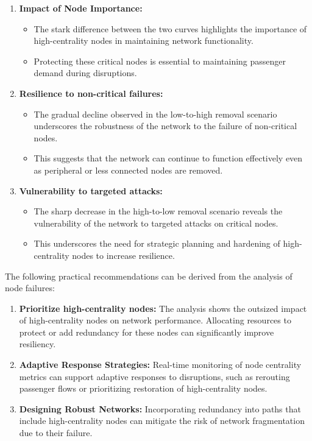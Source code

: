 \documentclass[
  letterpaper,
  DIV=11,
  numbers=noendperiod]{scrartcl}
\providecommand{\tightlist}{%
  \setlength{\itemsep}{0pt}\setlength{\parskip}{0pt}}\usepackage{longtable,booktabs,array}
\begin{document}
\begin{enumerate}
\def\labelenumi{\arabic{enumi}.}
\item
  \textbf{Impact of Node Importance:}

  \begin{itemize}
  \tightlist
  \item
    The stark difference between the two curves highlights the
    importance of high-centrality nodes in maintaining network
    functionality.
  \item
    Protecting these critical nodes is essential to maintaining
    passenger demand during disruptions.
  \end{itemize}
\item
  \textbf{Resilience to non-critical failures:}

  \begin{itemize}
  \tightlist
  \item
    The gradual decline observed in the low-to-high removal scenario
    underscores the robustness of the network to the failure of
    non-critical nodes.
  \item
    This suggests that the network can continue to function effectively
    even as peripheral or less connected nodes are removed.
  \end{itemize}
\item
  \textbf{Vulnerability to targeted attacks:}

  \begin{itemize}
  \tightlist
  \item
    The sharp decrease in the high-to-low removal scenario reveals the
    vulnerability of the network to targeted attacks on critical nodes.
  \item
    This underscores the need for strategic planning and hardening of
    high-centrality nodes to increase resilience.
  \end{itemize}
\end{enumerate}

The following practical recommendations can be derived from the analysis
of node failures:

\begin{enumerate}
\def\labelenumi{\arabic{enumi}.}
\tightlist
\item
  \textbf{Prioritize high-centrality nodes:} The analysis shows the
  outsized impact of high-centrality nodes on network performance.
  Allocating resources to protect or add redundancy for these nodes can
  significantly improve resiliency.
\item
  \textbf{Adaptive Response Strategies:} Real-time monitoring of node
  centrality metrics can support adaptive responses to disruptions, such
  as rerouting passenger flows or prioritizing restoration of
  high-centrality nodes.
\item
  \textbf{Designing Robust Networks:} Incorporating redundancy into
  paths that include high-centrality nodes can mitigate the risk of
  network fragmentation due to their failure.
\end{enumerate}
\end{document}
